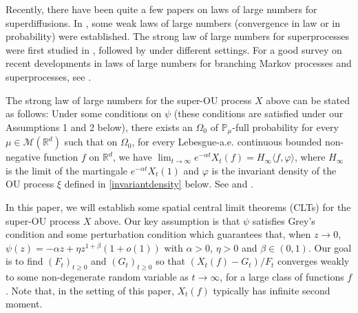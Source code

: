 \documentclass[EJP]{ejpecp} %
\begin{document}
	Recently, there have been quite a few papers on laws of large numbers for superdiffusions.
	In \cite{Englander2009Law, EnglanderWinter2006Law, EnglanderTuraev2002A-scaling}, some weak laws of large numbers (convergence in law or in probability) were established.
	The strong law of large numbers for superprocesses 
	were first 
	studied in \cite{ChenRenWang2008An-almost}, followed by \cite{ChenRenSongZhang2015Strong-law, ChenRenYang2019Skeleton, EckhoffKyprianouWinkel2015Spines, KouritzinRen2014A-strong, LiuRenSong2013Strong, Wang2010An-almost} under different settings.
	For a good survey on recent developments in laws of large numbers for branching Markov processes and superprocesses, see \cite{EckhoffKyprianouWinkel2015Spines}.

	The strong law of large numbers for the super-OU process $X$ above can be stated as follows:
	Under some conditions on $\psi$ (these conditions are satisfied under our Assumptions 1 and 2 below), there exists an $\Omega_0$ of $\mathbb{P}_\mu$-full probability for every $\mu\in\mathcal M(\mathbb R^d)$ such that on $\Omega_0$, for every Lebesgue-a.\/e. continuous bounded non-negative function $f$ on $\mathbb R^d$, we have $\lim_{t\to\infty} e^{-\alpha t} X_t(f) =H_\infty\langle f, \varphi\rangle $, where $H_\infty$ is the limit of the martingale $e^{-\alpha t}X_t(1)$ and $\varphi$ is the invariant density of the OU process $\xi$ defined in \eqref{invariantdensity} below.
	See \cite[Theorem 2.13 \& Example 8.1]{ChenRenYang2019Skeleton} and \cite[Theorem 1.2 \& Example 4.1]{EckhoffKyprianouWinkel2015Spines}.

	In this paper, we will establish some spatial central limit theorems (CLTs) for the super-OU process $X$ above.
	Our key assumption is that $\psi$ satisfies Grey's condition 
	and some perturbation condition 
	which guarantees that, when  $z\to 0$, $\psi(z)=-\alpha z + \eta z^{1+\beta} (1+o(1))$ with $\alpha > 0$, $\eta>0$ and $\beta\in (0, 1)$.
	Our  goal is to find $(F_t)_{t\geq 0}$ and $(G_t)_{t\geq 0}$ so that $(X_t(f) -G_t)/F_t $ converges weakly to some non-degenerate random variable as $t\rightarrow\infty$, for a large class of functions $f$.
	Note that, in the setting of this paper, $X_t(f)$ typically has infinite second moment.
\end{document}
